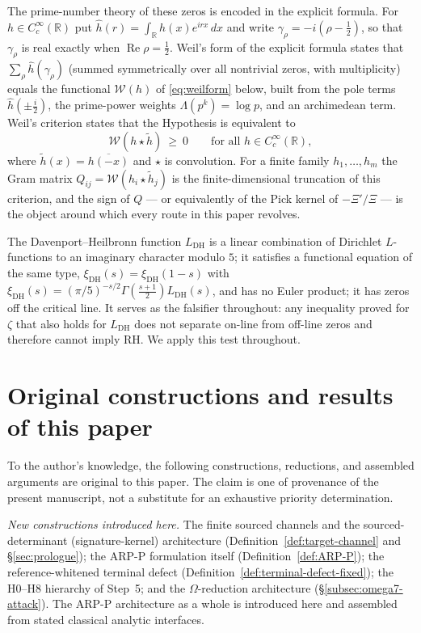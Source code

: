 \documentclass[11pt]{amsart}
\theoremstyle{definition}
\theoremstyle{remark}
\theoremstyle{definition}
\renewcommand{\Re}{\operatorname{Re}}
\newcommand{\cW}{\mathcal{W}}
\newcommand{\R}{\mathbb{R}}
\begin{document}
The prime-number theory of these zeros is encoded in the explicit formula. For $h\in C_c^\infty(\R)$ put
$\widehat h(r)=\int_\R h(x)e^{irx}\,dx$ and write $\gamma_\rho=-i(\rho-\tfrac12)$, so that
$\gamma_\rho$ is real exactly when $\Re\rho=\tfrac12$. Weil's form of the explicit formula
\cite{Weil1952} states that $\sum_\rho\widehat h(\gamma_\rho)$ (summed symmetrically over all nontrivial
zeros, with multiplicity) equals the functional $\cW(h)$ of \eqref{eq:weilform} below, built from the
pole terms $\widehat h(\pm\tfrac i2)$, the prime-power weights $\Lambda(p^k)=\log p$, and an archimedean
term. Weil's criterion states that the Hypothesis is equivalent to
\[
   \cW(h\star\tilde h)\ \ge\ 0\qquad\text{for all }h\in C_c^\infty(\R),
\]
where $\tilde h(x)=\overline{h(-x)}$ and $\star$ is convolution. For a finite family $h_1,\dots,h_m$ the
Gram matrix $Q_{ij}=\cW(h_i\star\tilde h_j)$ is the finite-dimensional truncation of this criterion, and
the sign of $Q$ --- or
equivalently of the Pick kernel of $-\Xi'/\Xi$ --- is the object around which every route in this paper
revolves.

The Davenport--Heilbronn function $L_{\mathrm{DH}}$ \cite{DavenportHeilbronn,Titchmarsh} is a linear
combination of Dirichlet $L$-functions to an imaginary character modulo $5$; it satisfies a functional equation of the same type, $\xi_{\mathrm{DH}}(s)=\xi_{\mathrm{DH}}(1-s)$ with $\xi_{\mathrm{DH}}(s)=(\pi/5)^{-s/2}\Gamma(\tfrac{s+1}2)L_{\mathrm{DH}}(s)$, and has no Euler product; it has zeros off the critical line. It serves as the falsifier throughout: any inequality proved for $\zeta$ that also holds
for $L_{\mathrm{DH}}$ does not separate on-line from off-line zeros and therefore cannot imply RH. We apply this test throughout.

\section*{Original constructions and results of this paper}\label{sec:provenance}

To the author's knowledge, the following constructions, reductions, and assembled arguments are original
to this paper.  The claim is one of provenance of the present manuscript, not a substitute for an
exhaustive priority determination.

\emph{New constructions introduced here.}  The finite sourced channels and the sourced-determinant
(signature-kernel) architecture (Definition~\ref{def:target-channel} and \S\ref{sec:prologue}); the
ARP-P formulation itself (Definition~\ref{def:ARP-P}); the reference-whitened terminal defect
(Definition~\ref{def:terminal-defect-fixed}); the H0--H8 hierarchy of Step~5; and the $\Omega$-reduction
architecture (\S\ref{subsec:omega7-attack}).  The ARP-P architecture as a whole is introduced here and
assembled from stated classical analytic interfaces.
\end{document}
